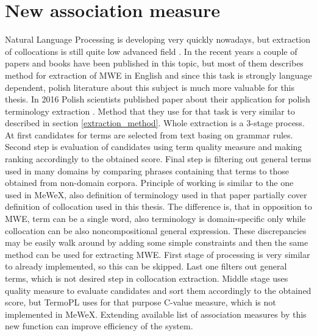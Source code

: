 \chapter{New association measure}

Natural Language Processing is developing very quickly nowadays, but extraction of collocations is still quite low advanced field \cite{ramisch}. 
In the recent years a couple of papers and books have been published in this topic, but most of them describes method for extraction of MWE in English 
and since this task is strongly language dependent, polish literature about this subject is much more valuable for this thesis.
In 2016 Polish scientists published paper about their application for polish terminology extraction \cite{termopl}. 
Method that they use for that task is very similar to described in section \ref{extraction_method}. 
Whole extraction is a 3-stage process. At first candidates for terms are selected from text basing on grammar rules. 
Second step is evaluation of candidates using term quality measure and making ranking accordingly to the obtained score. 
Final step is filtering out general terms used in many domains by comparing phrases containing that terms to those obtained from non-domain corpora.
Principle of working is similar to the one used in MeWeX, also definition of terminology used in that paper 
partially cover definition of collocation used in this thesis. The difference is, that in opposition to MWE, term can be a single word, 
also terminology is domain-specific only while collocation can be also noncompositional general expression. 
These discrepancies may be easily walk around by adding some simple constraints and then the same method can be used for extracting MWE. 
First stage of processing is very similar to already implemented, so this can be skipped. Last one filters out general terms, 
which is not desired step in collocation extraction. Middle stage uses quality measure to evaluate candidates and sort them 
accordingly to the obtained score, but TermoPL uses for that purpose C-value measure, which is not implemented in MeWeX. 
Extending available list of association measures by this new function can improve efficiency of the system.

